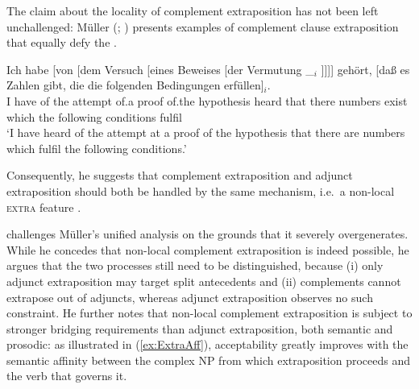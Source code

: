 \documentclass[output=paper,biblatex,babelshorthands,newtxmath,draftmode,colorlinks,citecolor=brown]{langscibook}
\begin{document}
The claim about the locality of complement extraposition has not been
left unchallenged: Müller (\citeyear[]{Mueller99a};
\citeyear[]{Mueller2004d}) presents examples of complement
clause extraposition that equally defy the .

\ea
\label{ex-versuch-eines-beweises-der-vermutung} 
{\gll Ich habe [von [dem Versuch [eines Beweises [der Vermutung \_$_i$ ]]]] gehört, [daß es Zahlen gibt, die die folgenden Bedingungen erfüllen]$_i$.\footnotemark\\
      I have \spacebr{}of \spacebr{}the attempt \spacebr{}of.a proof \spacebr{}of.the hypothesis {} {}
      heard \spacebr{}that there numbers exist which the following conditions
      fulfil\\
      \glt `I have heard of the attempt at a proof of the hypothesis
      that there are numbers which fulfil the following conditions.'
    }  
    
\z

Consequently, he suggests that complement extraposition and adjunct
extraposition should both be handled by the same mechanism, i.e.\ a
non-local \textsc{extra} feature \parencites{Keller:95}[Section~13.2]{Mueller99a}.

\citet{crysmann_b09xtra} challenges Müller's unified analysis on the
grounds that it severely overgenerates.  While he concedes that
non-local complement extraposition is indeed possible, he argues that
the two processes still need to be distinguished, because (i) only
adjunct extraposition may target split antecedents and (ii)
complements cannot extrapose out of adjuncts, whereas adjunct
extraposition observes no such constraint.  He further notes that
non-local complement extraposition is subject to stronger bridging
requirements than adjunct extraposition, both semantic and prosodic:
as illustrated in (\ref{ex:ExtraAff}), acceptability greatly improves
with the semantic affinity between the complex NP from which
extraposition proceeds and the verb that governs it.
\end{document}
